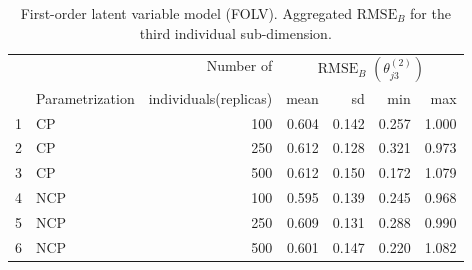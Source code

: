 %
\begin{table}[H]
	\centering
	\begin{tabular}{rlrrrrr}
		\hline
		\multicolumn{2}{c}{ } & Number of & \multicolumn{4}{c}{ $\text{RMSE}_{B}$ $( \theta^{(2)}_{j3} )$} \\ 
		\cmidrule(rl){4-7}
		& Parametrization & individuals(replicas) & mean & sd & min & max \\  
		\hline\hline
		1 & CP &  100 & 0.604 & 0.142 & 0.257 & 1.000 \\  
		2 & CP &  250 & 0.612 & 0.128 & 0.321 & 0.973 \\  
		3 & CP &  500 & 0.612 & 0.150 & 0.172 & 1.079 \\ 
		\hline
		4 & NCP &  100 & 0.595 & 0.139 & 0.245 & 0.968 \\  
		5 & NCP &  250 & 0.609 & 0.131 & 0.288 & 0.990 \\ 
		6 & NCP &  500 & 0.601 & 0.147 & 0.220 & 1.082 \\  
		\hline
	\end{tabular}
	\caption[First-order latent variable model (FOLV). Aggregated $\text{RMSE}_{B}$ for the third individual sub-dimension.]%
	{First-order latent variable model (FOLV). Aggregated $\text{RMSE}_{B}$ for the third individual sub-dimension.}
	\label{tab:FOLV_RMSE_theta3}
\end{table}
%
